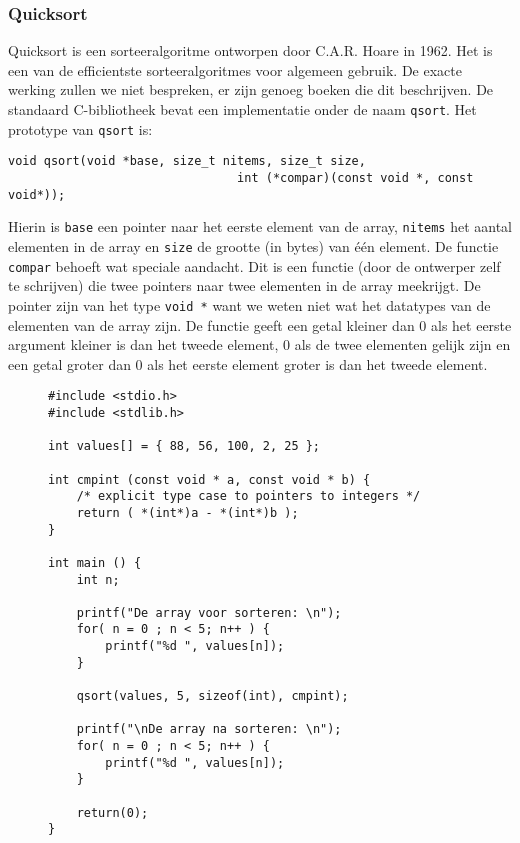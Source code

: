 \subsubsection*{Quicksort}
Quicksort is een sorteeralgoritme ontworpen door C.A.R. Hoare in 1962. Het is een van de efficientste sorteeralgoritmes voor algemeen gebruik. De exacte werking zullen we niet bespreken, er zijn genoeg boeken die dit beschrijven. De standaard C-bibliotheek bevat een implementatie onder de naam \texttt{qsort}. Het prototype van \texttt{qsort} is:


\hspace*{1em}\lstinline|void qsort(void *base, size_t nitems, size_t size, |\\
\hspace*{1em}\lstinline|                                int (*compar)(const void *, const void*));|

Hierin is \texttt{base} een pointer naar het eerste element van de array, \texttt{nitems} het aantal elementen in de array en \texttt{size} de grootte (in bytes) van één element. De functie \texttt{compar} behoeft wat speciale aandacht. Dit is een functie (door de ontwerper zelf te schrijven) die twee pointers naar twee elementen in de array meekrijgt. De pointer zijn van het type \texttt{void~*} want we weten niet wat het datatypes van de elementen van de array zijn. De functie geeft een getal kleiner dan 0 als het eerste argument kleiner is dan het tweede element, 0 als de twee elementen gelijk zijn en een getal groter dan 0 als het eerste element groter is dan het tweede element.

\begin{figure}[!ht]
\begin{lstlisting}[caption=Sorteren van een array met quicksort.,label=cod:poiexampleqsort]
#include <stdio.h>
#include <stdlib.h>

int values[] = { 88, 56, 100, 2, 25 };

int cmpint (const void * a, const void * b) {
    /* explicit type case to pointers to integers */
    return ( *(int*)a - *(int*)b );
}

int main () {
    int n;

    printf("De array voor sorteren: \n");
    for( n = 0 ; n < 5; n++ ) {
        printf("%d ", values[n]);
    }

    qsort(values, 5, sizeof(int), cmpint);

    printf("\nDe array na sorteren: \n");
    for( n = 0 ; n < 5; n++ ) {
        printf("%d ", values[n]);
    }

    return(0);
}
\end{lstlisting}
\end{figure}

